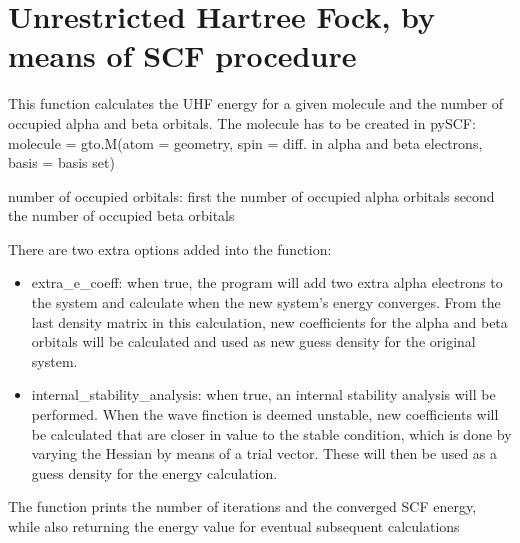 \documentclass[letterpaper,10pt,english]{sphinxmanual}
\begin{document}
\label{\detokenize{UHF:module-ghf.UHF}}

\chapter{Unrestricted Hartree Fock, by means of SCF procedure}
\label{\detokenize{UHF:unrestricted-hartree-fock-by-means-of-scf-procedure}}\label{\detokenize{UHF::doc}}
This function calculates the UHF energy for a given molecule and the number of occupied alpha and beta orbitals. 
The molecule has to be created in pySCF:
molecule = gto.M(atom = geometry, spin = diff. in alpha and beta electrons, basis = basis set)

number of occupied orbitals:
first the number of occupied alpha orbitals
second the number of occupied beta orbitals

There are two extra options added into the function:
\begin{itemize}
\item {} 
extra\_e\_coeff: when true, the program will add two extra alpha electrons to the system and calculate when the new system’s energy converges. From the last density matrix in this calculation, new coefficients for the alpha and beta orbitals will be calculated and used as new guess density for the original system.

\item {} 
internal\_stability\_analysis: when true, an internal stability analysis will be performed. When the wave finction is deemed unstable, new coefficients will be calculated that are closer in value to the stable condition, which is done by varying the Hessian by means of a trial vector. These will then be used as a guess density for the energy calculation.

\end{itemize}

The function prints the number of iterations and the converged SCF energy, while also returning the energy value
for eventual subsequent calculations
\end{document}
